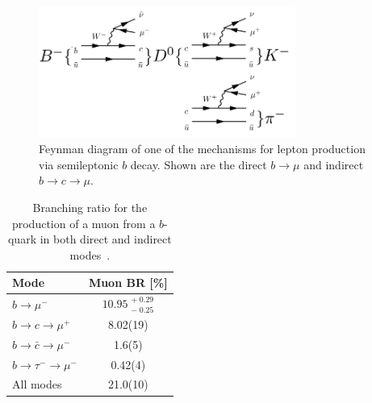 \begin{figure}[htbp]
  \centering
    \includegraphics[width=0.75\textwidth]{PartDetector/Diagrams/SemiLeptonicDecay.pdf}
    \caption[Feynman diagram of one of the mechanisms for lepton production via semileptonic $b$ decay.]{Feynman diagram of one of the mechanisms for lepton production via semileptonic $b$ decay. Shown are the direct $b\rightarrow \mu$ and indirect $b\rightarrow c\rightarrow\mu$.}
  \label{fig:DetectorSLTFeynm}
\end{figure}

\begin{table}[htbp]
  \centering
    \begin{tabular}{@{}lS[table-format=2.2(2)]@{}}
      \toprule
      Mode                                        & {Muon BR [\si{\percent}]} \\
      \midrule %
      $b\rightarrow \mu^{-}$                      & {$\num{10.95}\;^{+\;0.29}_{-\;0.25}$} \\
      $b\rightarrow c \rightarrow \mu^{+}$        & 8.02(19) \\
      $b\rightarrow \bar{c} \rightarrow \mu^{-}$  & 1.6(5) \\
      $b\rightarrow \tau^{-} \rightarrow \mu^{-}$ & 0.42(4) \\
      \midrule %
      All modes                                   & 21.0(10) \\
      \bottomrule %
    \end{tabular}
    \caption[Branching ratio for the production of a muon from a $b$-quark in both direct and indirect modes.]{Branching ratio for the production of a muon from a $b$-quark in both direct and indirect modes~\cite{Theory:PDGBooklet}.}
  \label{tab:DetectorSLTBR}
\end{table}

